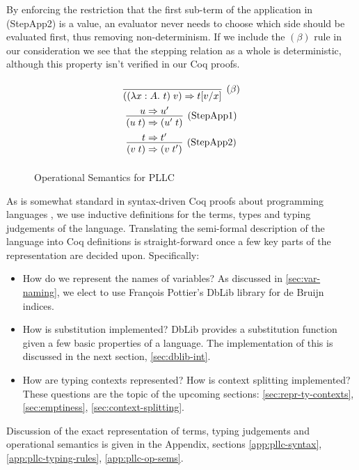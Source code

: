 \documentclass[]{unswthesis}
\newcommand{\Francois}{Fran\frenchc{c}ois }
\newcommand{\lam}[1]{\lambda #1 \ldotp \,}
\newcommand{\app}[2]{(#1 \; #2)}
\newcommand{\steps}{\Rightarrow}
\let\frenchc\c
\let\c\texttt
\let\t\text
\begin{document}
By enforcing the restriction that the first sub-term of the application in (StepApp2) is a value, an evaluator never needs to choose which side should be evaluated first, thus removing non-determinism. If we include the $(\beta)$ rule in our consideration we see that the stepping relation as a whole is deterministic, although this property isn't verified in our Coq proofs.

\begin{figure}[h]
\caption{Operational Semantics for PLLC}
\label{pllc-op-sems}
\begin{displaymath}
\arraycolsep=1.4pt\def\arraystretch{2.2}
\begin{array}{cc}
\infer[(\beta)]{\app{(\lam{x : A} t)}{v} \steps t[v / x]}{} \\
\infer[\t{(StepApp1)}]{\app{u}{t} \steps \app{u'}{t}}{u \steps u'} \\
\infer[\t{(StepApp2)}]{\app{v}{t} \steps \app{v}{t'}}{t \steps t'} \\
\end{array}
\end{displaymath}
\end{figure}

As is somewhat standard in syntax-driven Coq proofs about programming languages \cite{pierce15}, we use inductive definitions for the terms, types and typing judgements of the language. Translating the semi-formal description of the language into Coq definitions is straight-forward once a few key parts of the representation are decided upon. Specifically:

\begin{itemize}
\item How do we represent the names of variables? As discussed in \cref{sec:var-naming}, we elect to use \Francois Pottier's DbLib library for de Bruijn indices.
\item How is substitution implemented? DbLib provides a substitution function given a few basic properties of a language. The implementation of this is discussed in the next section, \cref{sec:dblib-int}.
\item How are typing contexts represented? How is context splitting implemented? These questions are the topic of the upcoming sections: \cref{sec:repr-ty-contexts}, \cref{sec:emptiness}, \cref{sec:context-splitting}.
\end{itemize}

Discussion of the exact representation of terms, typing judgements and operational semantics is given in the Appendix, sections \cref{app:pllc-syntax}, \cref{app:pllc-typing-rules}, \cref{app:pllc-op-sems}.
\end{document}

